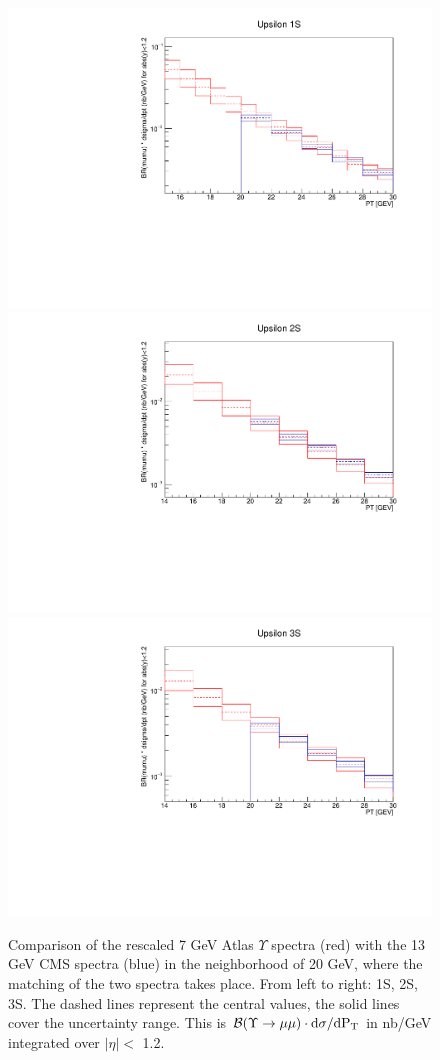 \documentclass[12pt]{article}
\begin{document}
\begin{figure}
\begin{adjustwidth}{-3cm}{-3cm}
\centering
\includegraphics[width=0.32\linewidth]{../oniaDirect/upsilon/upsilon-1s-atlas-cms-comparison.pdf}
\includegraphics[width=0.32\linewidth]{../oniaDirect/upsilon/upsilon-2s-atlas-cms-comparison.pdf}
\includegraphics[width=0.32\linewidth]{../oniaDirect/upsilon/upsilon-3s-atlas-cms-comparison.pdf}
\end{adjustwidth}
\caption{\protect Comparison of the rescaled 7 GeV Atlas $\Upsilon$ spectra (red) with the
  13 GeV CMS spectra (blue) in the neighborhood of 20 GeV, where the matching of
  the two spectra takes place.  From left to right: 1S, 2S, 3S.
  The dashed lines represent the central values, the solid
  lines cover the uncertainty range.  This is ${\cal B}(\Upsilon \to \mu\mu) \cdot
  \rm{d}\sigma/\rm{d}P_T$ in nb/GeV integrated
  over $|\eta| <$ 1.2.}
\label{fig:checkMatch}
\end{figure}
\end{document}
